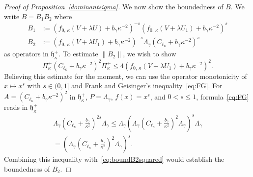 \documentclass[AHL,Unicode,longabstracts,published]{cedram}
\newcommand*\gh{\mathfrak{h}}
\newcommand*\ghpk{{\gh^+_\kappa}}
\newcommand*\ppp{\Pi^+_\kappa}
\begin{document}
\begin{proof}[Proof of Proposition~\ref{dominantsigma}]
We now show the boundedness of $B$. We write $B=B_1B_2$ where
\begin{align*}
B_1 & := \left(f_{0,\,\kappa}\left(V+\lambda U\right)+b_\gamma\kappa^{-2}\right)^{-s} \left(f_{0,\,\kappa}\left(V+\lambda U_1\right)+b_\gamma\kappa^{-2}\right)^s\\
B_2 & := \left(f_{0,\,\kappa}\left(V+\lambda U_1\right)+b_\gamma\kappa^{-2}\right)^{-s}\Lambda_\gamma\left(C_{\ell_\kappa}+b_\gamma\kappa^{-2}\right)^s
\end{align*}
as operators in $\ghpk$. To estimate $\|B_2\|$, we wish to show
\begin{equation}\label{eq:boundB2squared}
\ppp\left(C_{\ell_\kappa}+b_\gamma\kappa^{-2}\right)^{2}\ppp
\leq 4\left(f_{0,\,\kappa}\left(V+\lambda U_1\right)+b_\gamma\kappa^{-2}\right)^{2}.
\end{equation}
Believing this estimate for the moment, we can use the operator monotonicity of $x\mapsto x^{s}$ with $s\in(0,1]$ and Frank and Geisinger's inequality~\eqref{eq:FG}. For $A=(C_{\ell_\kappa}+b_\gamma\kappa^{-2})^2$ in $\ghpk$, $P=\Lambda_\gamma$, $f(x)=x^s$, and $0<s\leq1$, formula~\eqref{eq:FG} reads in $\ghpk$
\begin{multline}\label{eq:SDgen}
\Lambda_\gamma \left(C_{\ell_\kappa}+\frac{b_\gamma}{\kappa^2}\right)^{2s}\Lambda_\gamma
\leq \Lambda_\gamma\left(\Lambda_\gamma\left(C_{\ell_\kappa}+\frac{b_\gamma}{\kappa^2}\right)^2\Lambda_\gamma\right)^s\Lambda_\gamma \\= \left(\Lambda_\gamma\left(C_{\ell_\kappa}+\frac{b_\gamma}{\kappa^2}\right)^2\Lambda_\gamma\right)^s.
\end{multline}
Combining this inequality with~\eqref{eq:boundB2squared} would establish the boundedness of $B_2$.


\end{proof}
\end{document}
